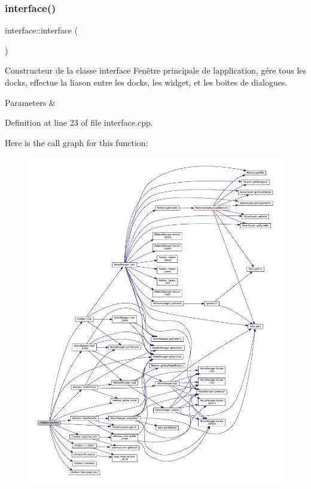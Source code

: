\subsubsection{\texorpdfstring{interface()}{interface()}}
{\footnotesize\ttfamily interface\+::interface (\begin{DoxyParamCaption}{ }\end{DoxyParamCaption})}



Constructeur de la classe interface Fenêtre principale de l\textquotesingle{}application, gére tous les docks, effectue la liason entre les docks, les widget, et les boites de dialogues. 


\begin{DoxyParams}{Parameters}
{\em } & \\
\hline
\end{DoxyParams}


Definition at line 23 of file interface.\+cpp.

Here is the call graph for this function\+:
\nopagebreak
\begin{figure}[H]
\begin{center}
\leavevmode
\includegraphics[width=350pt]{classinterface_a13e0ee4b9df1714d747d62ec46220c55_cgraph}
\end{center}
\end{figure}
\mbox{\label{classinterface_a8511f28c5bc5d3c24a24e9aaef4db502}} 
